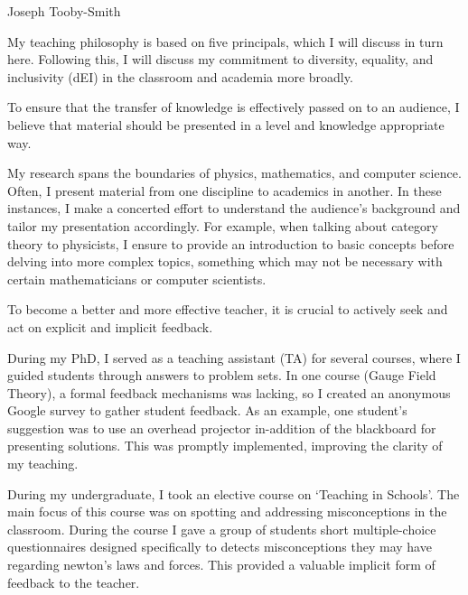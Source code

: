 \documentclass[12pt,letter]{article}
\newcounter{customtitle}
\begin{document}
\vspace{-1cm}
\begin{flushright}
{{\Large \color{white}Joseph Tooby-Smith}}
\end{flushright}
\vspace{0.4cm}

My teaching philosophy is based on five principals, which I will discuss in turn here. Following this, I will discuss my commitment to diversity, equality, and inclusivity (dEI) in the classroom and academia more broadly.
 
 
 To ensure that the transfer of knowledge is effectively passed on to an audience, I believe that material should be presented in a level and knowledge appropriate way. 
 
 
 My research spans the boundaries of physics, mathematics, and computer science. Often, I present material from one discipline to academics in another. In these instances, I make a concerted effort to understand the audience's background and tailor my presentation accordingly. For example, when talking about category theory to physicists, I ensure to provide an introduction to basic concepts before delving into more complex topics, something which may not be necessary with certain mathematicians or computer scientists.


 To become a better and more effective teacher, it is crucial to actively seek and act on explicit and implicit feedback.
 
 During my PhD, I served as a teaching assistant (TA) for several courses, where I guided students through answers to problem sets. In one course (Gauge Field Theory), a formal feedback mechanisms was lacking, so I created an anonymous Google survey to gather student feedback. As an example, one student's suggestion was to use an overhead projector in-addition of the blackboard for presenting solutions.  This was promptly implemented, improving the clarity of my teaching.
 
 During my undergraduate, I took an elective course on `Teaching in Schools'. The main focus of this course was on spotting and addressing misconceptions in the classroom.  
 During the course I gave a group of students short multiple-choice questionnaires designed specifically to detects misconceptions they may have regarding newton's laws and forces. This provided a valuable implicit form of feedback to the teacher. 
 
\end{document}
